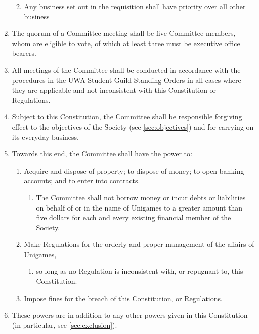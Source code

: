 \documentclass[a4paper]{article}
\begin{document}
\begin{enumerate}
\begin{enumerate}
\begin{enumerate}
                    \end{enumerate}
              \item Any business set out in the requisition shall have priority over all other business
          \end{enumerate}
    \item The quorum of a Committee meeting shall be five Committee members, whom are eligible to vote, of which at least three must be executive office bearers.
    \item All meetings of the Committee shall be conducted in accordance with the procedures in the UWA Student Guild Standing Orders in all cases where they are applicable and not inconsistent with this Constitution or Regulations.
    \item Subject to this Constitution, the Committee shall be responsible forgiving effect to the objectives of the Society (see \cref{sec:objectives}) and for carrying on its everyday business.
    \item Towards this end, the Committee shall have the power to:
          \begin{enumerate}
              \item Acquire and dispose of property; to dispose of money; to open banking accounts; and to enter into contracts.
                    \begin{enumerate}
                        \item The Committee shall not borrow money or incur debts or liabilities on behalf of or in the name of Unigames to a greater amount than five dollars for each and every existing financial member of the Society.
                    \end{enumerate}
              \item Make Regulations for the orderly and proper management of the affairs of Unigames,
                    \begin{enumerate}
                        \item so long as no Regulation is inconsistent with, or repugnant to, this Constitution.
                    \end{enumerate}
              \item Impose fines for the breach of this Constitution, or Regulations.
          \end{enumerate}
    \item These powers are in addition to any other powers given in this Constitution (in particular, see \cref{sec:exclusion}).
\end{enumerate}
\end{document}
